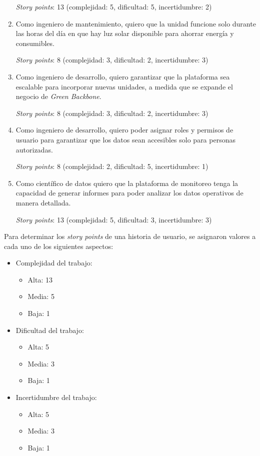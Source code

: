 \documentclass[
11pt, %
]{charter}
\begin{document}
\begin{enumerate}
\textit{Story points}: 13 (complejidad: 5, dificultad: 5, incertidumbre: 2)

\item Como ingeniero de mantenimiento, quiero que la unidad funcione solo durante las horas del día en que hay luz solar disponible para ahorrar energía y consumibles.

\textit{Story points}: 8 (complejidad: 3, dificultad: 2, incertidumbre: 3)

\item Como ingeniero de desarrollo, quiero garantizar que la plataforma sea escalable para incorporar nuevas unidades, a medida que se expande el negocio de \textit{Green Backbone}. 

\textit{Story points}: 8 (complejidad: 3, dificultad: 2, incertidumbre: 3)

\item Como ingeniero de desarrollo, quiero poder asignar roles y permisos de usuario para garantizar que los datos sean accesibles solo para personas autorizadas. 

\textit{Story points}: 8 (complejidad: 2, dificultad: 5, incertidumbre: 1)

\item Como científico de datos quiero que la plataforma de monitoreo tenga la capacidad de generar informes para poder analizar los datos operativos de manera detallada. 

\textit{Story points}: 13 (complejidad: 5, dificultad: 3, incertidumbre: 3)
\end{enumerate}

Para determinar los \textit{story points} de una historia de usuario, se asignaron valores a cada uno de los siguientes aspectos:
\begin{itemize}
\item Complejidad del trabajo:
	\begin{itemize}
	\item Alta: 13
	\item Media: 5
	\item Baja: 1
	\end{itemize}
\item Dificultad del trabajo:
	\begin{itemize}
	\item Alta: 5
	\item Media: 3
	\item Baja: 1
	\end{itemize}
\item Incertidumbre del trabajo:
	\begin{itemize}
	\item Alta: 5
	\item Media: 3
	\item Baja: 1
	\end{itemize}
\end{itemize}
\end{document}
